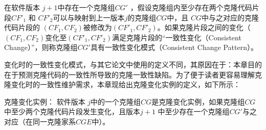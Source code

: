 \begin{definition}
[变化时一致性变化模式] 
\label{def-changingpattern}
在软件版本 $j+1$中存在一个克隆组$CG'$ ，假设克隆组内至少存在两个克隆代码片段$CF'_1$ 和 $CF'_2$可以与映射到上一版本$j$的克隆组$CG$中，且 $CG$中与之对应的克隆代码片段的 $(CF_1,CF_2)$被修改为$(CF'_1,CF'_2)$。如果克隆片段之间的变化（ $(CF_1,CF_2)$变化至$(CF'_1,CF'_2)$满足克隆片段的“一致性变化（Consistent Change）”，则称克隆组$CG'$具有一致性变化模式（Consistent Change Pattern）。
\end{definition}


变化时的一致性变化模式，与其它论文中使用的定义不同，其原因在于：本章目的在于预测克隆代码的一致性所导致的克隆一致性缺陷。为了便于读者更容易理解克隆变化时的一致性维护需求，本章现给出克隆变化实例的定义，如下所示：\\


\begin{definition}
[克隆变化实例] 
\label{def-changinginstance}
克隆变化实例：
软件版本 $j$中的一个克隆组$CG$是克隆变化实例，如果克隆组$CG$中至少两个克隆代码片段发生变化，且版本$j+1$ 中至少存在一个克隆组$CG'$与之对应（在同一克隆家系$CGE$中）。 
\end{definition}

